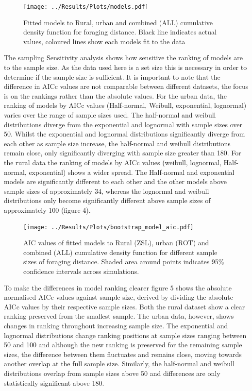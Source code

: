 \documentclass[11pt]{article}
\begin{document}
\begin{linenumbers}


\begin{figure}[H]
	\texttt{[image: ../Results/Plots/models.pdf]}
	\caption{ Fitted models to Rural, urban and combined (ALL) cumulative density function for foraging distance. Black line indicates actual values, coloured lines show each models fit to the data}
\end{figure}

The sampling Sensitivity analysis shows how sensitive the ranking of models are to the sample size. As the data used here is a set size this is necessary in order to determine if the sample size is sufficient. It is important to note that the difference in AICc values are not comparable between different datasets, the focus is on the rankings rather than the absolute values. For the urban data, the ranking of models by AICc values (Half-normal, Weibull, exponential, lognormal) varies over the range of sample sizes used. The half-normal and weibull distributions diverge from the exponential and lognormal with sample sizes over 50. Whilst the exponential and lognormal distributions significantly diverge from each other as sample size increase, the half-normal and weibull distributions remain close, only significantly diverging with sample size greater than 180. For the rural data the ranking of models by AICc values (weibull, lognormal, Half-normal, exponential) shows a wider spread. The Half-normal and exponential models are significantly different to each other and the other models above sample sizes of approximately 34, whereas the lognormal and weibull distributions only become significantly different above sample sizes of approximately 100 (figure 4). \par

\begin{figure}[H]
	\centering
	\texttt{[image: ../Results/Plots/bootstrap\_model\_aic.pdf]}
	\caption{AIC values of fitted models to Rural (ZSL), urban (ROT) and combined (ALL) cumulative density function for different sample sizes of foraging distance. Shaded area around points indicates 95\% confidence intervals across simulations.}
\end{figure}

To make the differences in model ranking clearer figure 5 shows the absolute normalised AICc values against sample size, derived by dividing the absolute AICc values by their respective sample sizes. Both the rural dataset show a clear ranking preserved from the smallest sample. The urban data, however, shows changes in ranking throughout increasing sample size. The exponential and lognormal distributions change ranking positions at sample sizes ranging between 50 and 100 and although the new ranking is preserved for the remaining sample sizes, the difference between them fluctuates and remains close, moving towards another overlap at the full sample size. Similarly, the half-normal and weibull distributions overlap from sample sizes above 50 and differences are only statistically significant above 180.\par 


\end{linenumbers}
\end{document}

